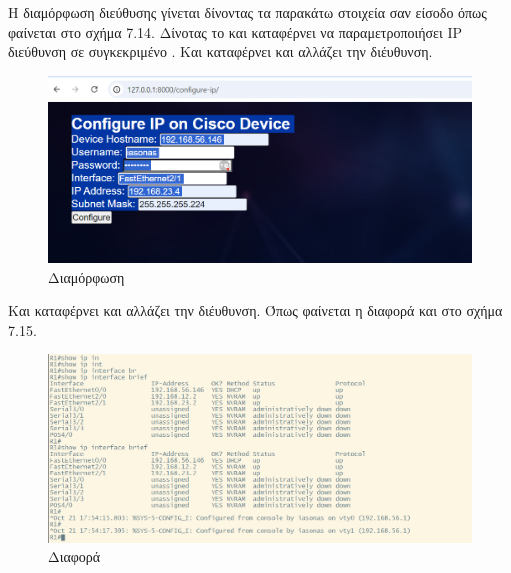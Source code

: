 Η διαμόρφωση  διεύθυσης γίνεται δίνοντας τα παρακάτω στοιχεία σαν είσοδο όπως φαίνεται στο σχήμα 7.14. Δίνοτας το  και  καταφέρνει να παραμετροποιήσει IP διεύθυνση σε συγκεκριμένο . Και καταφέρνει και αλλάζει την διέυθυνση. 

\FloatBarrier

\begin{figure}[h]
	\centering
	\includegraphics[width=1.0\textwidth]{graphics/configure_ip.png}
	\caption{Διαμόρφωση}
\end{figure}

\FloatBarrier

\noindent Και καταφέρνει και αλλάζει την διέυθυνση. Όπως φαίνεται η διαφορά και στο σχήμα 7.15.

\FloatBarrier

\begin{figure}[h]
	\centering
	\includegraphics[width=1.0\textwidth]{graphics/configure_ip_1.png}
	\caption{ Διαφορά}
\end{figure}

\FloatBarrier
